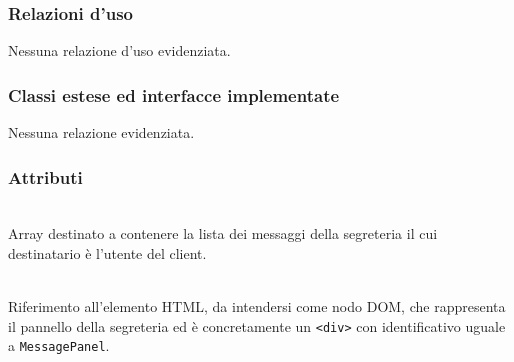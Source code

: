 \subsubsection*{Relazioni d'uso}
Nessuna relazione d'uso evidenziata.

\subsubsection*{Classi estese ed interfacce implementate}
Nessuna relazione evidenziata.

\subsubsection*{Attributi}
\begin{description}
 \item{}\\
 Array destinato a contenere la lista dei messaggi della segreteria il cui destinatario è l'utente del client.

 \item{}\\
  Riferimento all'elemento HTML, da intendersi come nodo DOM, che rappresenta il pannello della segreteria ed è concretamente un \verb'<div>' con identificativo uguale a \verb'MessagePanel'.
\end{description}

